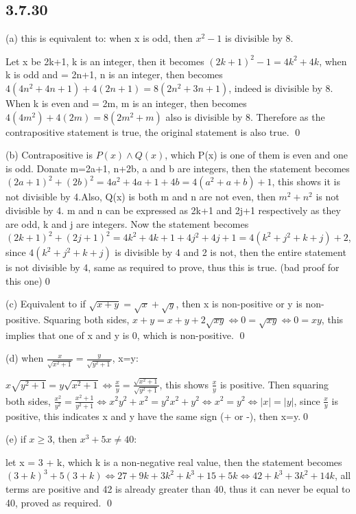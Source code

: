 \documentclass{article}
\begin{document}
\subsection*{3.7.30}

(a) this is equivalent to: when x is odd, then $x^2-1$ is divisible by 8.

Let x be 2k+1, k is an integer, then it becomes $(2k+1)^2-1 = 4k^2+4k$, when k is odd and = 2n+1, n is an integer, then becomes $4(4n^2+4n+1)+4(2n+1)=8(2n^2+3n+1)$, indeed is divisible by 8. When k is even and = 2m, m is an integer, then becomes $4(4m^2)+4(2m)=8(2m^2+m)$ also is divisible by 8. Therefore as the contrapositive statement is true, the original statement is also true. \qed

(b) Contrapositive is $P(x)\land Q(x)$, which P(x) is one of them is even and one is odd. Donate m=2a+1, n+2b, a and b are integers, then the statement becomes $(2a+1)^2+(2b)^2 = 4a^2+4a+1+4b=4(a^2+a+b)+1$, this shows it is not divisible by 4.Also, Q(x) is both m and n are not even, then $m^2+n^2$ is not divisible by 4. m and n can be expressed as 2k+1 and 2j+1 respectively as they are odd, k and j are integers. Now the statement becomes $(2k+1)^2+(2j+1)^2=4k^2+4k+1+4j^2+4j+1=4(k^2+j^2+k+j)+2$, since $4(k^2+j^2+k+j)$ is divisible by 4 and 2 is not, then the entire statement is not divisible by 4, same as required to prove, thus this is true. (bad proof for this one)\qed

(c) Equivalent to if $\sqrt{x+y}=\sqrt{x}+\sqrt{y}$, then x is non-positive or y is non-positive. Squaring both sides, $x+y=x+y+2\sqrt{xy}\iff 0=\sqrt{xy}\iff 0=xy$, this implies that one of x and y is 0, which is non-positive. \qed

(d) when $\frac{x}{\sqrt{x^2+1}}=\frac{y}{\sqrt{y^2+1}}$, x=y: 

$x\sqrt{y^2+1}=y\sqrt{x^2+1}\iff \frac{x}{y}=\frac{\sqrt{x^2+1}}{\sqrt{y^2+1}}$, this shows $\frac{x}{y}$ is positive. Then squaring both sides, $\frac{x^2}{y^2}=\frac{x^2+1}{y^2+1}\iff x^2y^2+x^2=y^2x^2+y^2\iff x^2=y^2\iff |x|=|y|$, since $\frac{x}{y}$ is positive, this indicates x and y have the same sign (+ or -), then x=y.\qed

(e) if $x\geq 3$, then $x^3+5x\neq 40$:

let x = 3 + k, which k is a non-negative real value, then the statement becomes $(3+k)^3+5(3+k)\iff 27+9k+3k^2+k^3+15+5k\iff 42+k^3+3k^2+14k$, all terms are positive and 42 is already greater than 40, thus it can never be equal to 40, proved as required. \qed
\end{document}
